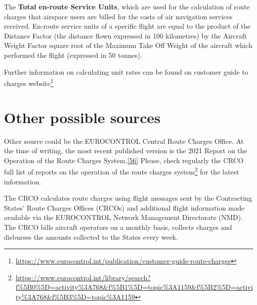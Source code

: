 \documentclass[
  11pt,
  a4paper,
]{book}
\DeclareRobustCommand{\href}[2]{#2\footnote{\url{#1}}}
\begin{document}
The \textbf{Total en-route Service Units}, which are used for the
calculation of route charges that airspace users are billed for the
costs of air navigation services received. En-route service units of a
specific flight are equal to the product of the Distance Factor (the
distance flown expressed in 100 kilometres) by the Aircraft Weight
Factor square root of the Maximum Take Off Weight of the aircraft which
performed the flight (expressed in 50 tonnes).

\begin{tcolorbox}[enhanced jigsaw, opacityback=0, arc=.35mm, colframe=quarto-callout-note-color-frame, breakable, left=2mm, leftrule=.75mm, titlerule=0mm, colbacktitle=quarto-callout-note-color!10!white, rightrule=.15mm, opacitybacktitle=0.6, bottomtitle=1mm, colback=white, toptitle=1mm, title=\textcolor{quarto-callout-note-color}{\faInfo}\hspace{0.5em}{Note}, bottomrule=.15mm, toprule=.15mm, coltitle=black]

Further information on calculating unit rates can be found on
\href{https://www.eurocontrol.int/publication/customer-guide-route-charges}{customer
guide to charges website}

\end{tcolorbox}

\hypertarget{other-possible-sources-3}{%
\section{Other possible sources}\label{other-possible-sources-3}}

Other source could be the EUROCONTROL Central Route Charges Office. At
the time of writing, the most recent published version is the 2021
Report on the Operation of the Route Charges
System.\protect\hyperlink{ref-ReportOperationRoute2022}{{[}56{]}}
Please, check regularly the
\href{https://www.eurocontrol.int/library/search?f\%5B0\%5D=activity\%3A768\&f\%5B1\%5D=topic\%3A1159\&f\%5B2\%5D=activity\%3A768\&f\%5B3\%5D=topic\%3A1159}{CRCO
full list of reports on the operation of the route charges system} for
the latest information.

The CRCO calculates route charges using flight messages sent by the
Contracting States' Route Charges Offices (CRCOs) and additional flight
information made available via the EUROCONTROL Network Management
Directorate (NMD). The CRCO bills aircraft operators on a monthly basis,
collects charges and disburses the amounts collected to the States every
week.
\end{document}
